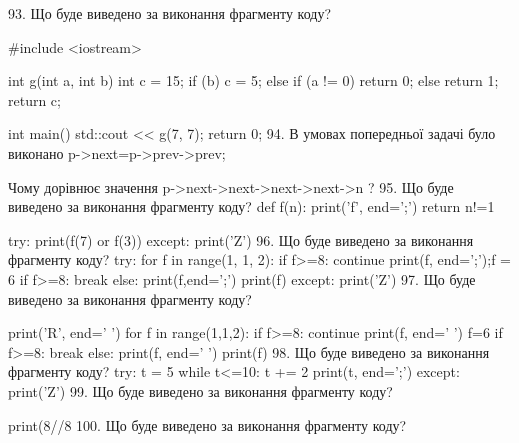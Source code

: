 \documentclass[11pt]{article}
\begin{document}
\vspace{5mm}
93. Що буде виведено за виконання фрагменту коду?

#include <iostream>

int g(int a, int b){
    int c = 15;
    if (b)
        c = 5;
    else if (a != 0)
         return 0;
    else 
        return 1;
    return c;
}

int main(){
    std::cout << g(7, 7);
    return 0;
}
\vspace{5mm}
94. 
В умовах попередньої задачі було виконано p->next=p->prev->prev;

Чому дорівнює значення p->next->next->next->next->n ?\vspace{5mm}
95. Що буде виведено за виконання фрагменту коду?
def f(n):
    print('f', end=';')
    return n!=1

try:
    print(f(7) or f(3))
except:
    print('Z')
\vspace{5mm}
96. Що буде виведено за виконання фрагменту коду?
try:
    for f in range(1, 1, 2):
        if f>=8:
            continue
        print(f, end=';');f = 6
        if f>=8:
            break
    else:
        print(f,end=';')
    print(f)
except:
    print('Z')
\vspace{5mm}
97. Що буде виведено за виконання фрагменту коду?

print('R', end=' ')
for f in range(1,1,2):
    if f>=8:
        continue
        print(f, end=' ')
        f=6
    if f>=8:
        break
    else:
        print(f, end=' ')
    print(f)
\vspace{5mm}
98. Що буде виведено за виконання фрагменту коду?
try:
    t = 5
    while t<=10:
        t += 2
    print(t, end=';')
except:
    print('Z')
\vspace{5mm}
99. Що буде виведено за виконання фрагменту коду?

print(8//8%
\vspace{5mm}
100. Що буде виведено за виконання фрагменту коду?
\end{document}
